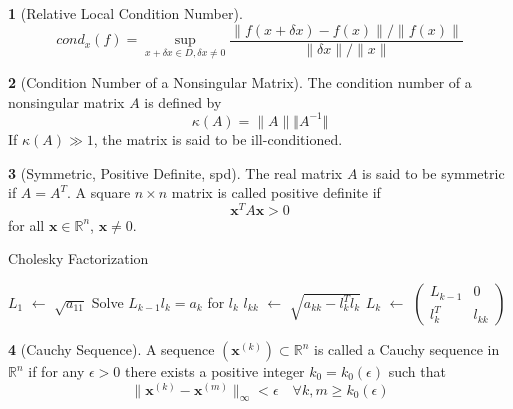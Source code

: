 \documentclass[12pt]{article}
\theoremstyle{definition}
\newtheorem{definition}{\color{NavyBlue}{\textbf{Definition}}}
\newcommand{\e}{\epsilon}
\newcommand{\R}{\mathbb{R}}
\newcommand{\norm}[1]{\lVert#1\rVert}
\newcommand{\x}{\bm{x}}
\newcommand*\Let[2]{\State #1 $\gets$ #2}
\begin{document}
\begin{definition}[Relative Local Condition Number]
\begin{equation}
cond_x(f) = \sup_{x + \delta x \in D, \delta x \neq 0} \frac{\norm{f(x + \delta x) - f(x)} / \norm{f(x)}}{\norm{\delta x} / \norm{x}}
\end{equation}
\end{definition}

\begin{definition}[Condition Number of a Nonsingular Matrix]
The condition number of a nonsingular matrix $A$ is defined by
\begin{equation}
\kappa(A) = \norm{A} \Vert A^{-1} \Vert
\end{equation}
If $\kappa(A) \gg 1$, the matrix is said to be ill-conditioned.
\end{definition}

\begin{definition}[Symmetric, Positive Definite, spd]
The real matrix $A$ is said to be symmetric if $A = A^T$. A square $n \times n$ matrix is called positive definite if
\begin{equation}
  \x^T A \x > 0
\end{equation}
for all $\x \in \R^n$, $\x \neq 0$.
\end{definition}

\begin{algorithm}
  \caption{Cholesky Factorization}
  \begin{algorithmic}[ht]
    \Require{$A \in \R^{n \times n}$, SPD}
    \Let{$L_1$}{$\sqrt{a_{11}}$}
     \State Solve $L_{k-1} l_k = a_k$ for $l_k$
     \Let{$l_{kk}$}{$\sqrt{a_{kk} - l_k^T l_k}$}
     \Let{$L_k$}{$\begin{pmatrix} L_{k-1} & 0 \\ l_k^T & l_{kk} \end{pmatrix}$}
    \EndFor
  \end{algorithmic}
\end{algorithm}

\begin{definition}[Cauchy Sequence]
A sequence $(\x^{(k)}) \subset \R^n$ is called a Cauchy sequence in $\R^n$ if for any $\e > 0$ there exists a positive integer $k_0 = k_0(\e)$ such that
\begin{equation}
\norm{\x^{(k)} - \x^{(m)}}_{\infty} < \e \quad \forall k, m \geq k_0(\e)
\end{equation}
\end{definition}
\end{document}
